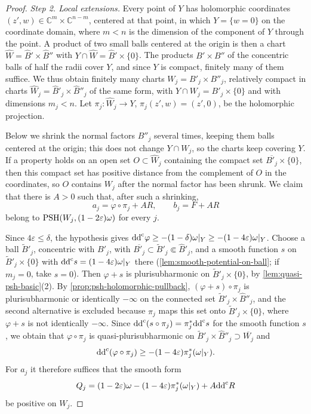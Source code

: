 \begin{proof}
\emph{Step 2. Local extensions.} Every point of $Y$ has holomorphic coordinates $(z',w)\in\mathbb C^m\times\mathbb C^{n-m}$, centered at that point, in which $Y=\{w=0\}$ on the coordinate domain, where $m<n$ is the dimension of the component of $Y$ through the point. A product of two small balls centered at the origin is then a chart $\widehat W=\widehat B'\times\widehat B''$ with $Y\cap\widehat W=\widehat B'\times\{0\}$. The products $B'\times B''$ of the concentric balls of half the radii cover $Y$, and since $Y$ is compact, finitely many of them suffice. We thus obtain finitely many charts $W_j=B'_j\times B''_j$, relatively compact in charts $\widehat W_j=\widehat B'_j\times\widehat B''_j$ of the same form, with $Y\cap W_j=B'_j\times\{0\}$ and with dimensions $m_j<n$. Let $\pi_j\colon\widehat W_j\to Y$, $\pi_j(z',w)=(z',0)$, be the holomorphic projection.

Below we shrink the normal factors $B''_j$ several times, keeping them balls centered at the origin; this does not change $Y\cap W_j$, so the charts keep covering $Y$. If a property holds on an open set $O\subset\widehat W_j$ containing the compact set $\overline{B'_j}\times\{0\}$, then this compact set has positive distance from the complement of $O$ in the coordinates, so $O$ contains $W_j$ after the normal factor has been shrunk. We claim that there is $A>0$ such that, after such a shrinking,
\[
 a_j=\varphi\circ\pi_j+AR,\qquad b_j=F+AR
\]
belong to $\mathrm{PSH}(W_j,(1-2\varepsilon)\omega)$ for every $j$.

Since $4\varepsilon\leq\delta$, the hypothesis gives $\mathrm{dd}^{\mathrm{c}}\varphi\geq-(1-\delta)\omega|_Y\geq-(1-4\varepsilon)\omega|_Y$. Choose a ball $\widetilde B'_j$, concentric with $B'_j$, with $\overline{B'_j}\subset\widetilde B'_j\Subset\widehat B'_j$, and a smooth function $s$ on $\widetilde B'_j\times\{0\}$ with $\mathrm{dd}^{\mathrm{c}} s=(1-4\varepsilon)\omega|_Y$ there (\cref{lem:smooth-potential-on-ball}; if $m_j=0$, take $s=0$). Then $\varphi+s$ is plurisubharmonic on $\widetilde B'_j\times\{0\}$, by \cref{lem:quasi-psh-basic}(2). By \cref{prop:psh-holomorphic-pullback}, $(\varphi+s)\circ\pi_j$ is plurisubharmonic or identically $-\infty$ on the connected set $\widetilde B'_j\times\widehat B''_j$, and the second alternative is excluded because $\pi_j$ maps this set onto $\widetilde B'_j\times\{0\}$, where $\varphi+s$ is not identically $-\infty$. Since $\mathrm{dd}^{\mathrm{c}}(s\circ\pi_j)=\pi_j^*\mathrm{dd}^{\mathrm{c}} s$ for the smooth function $s$, we obtain that $\varphi\circ\pi_j$ is quasi-plurisubharmonic on $\widetilde B'_j\times\widehat B''_j\supset\overline{W_j}$ and
\[
 \mathrm{dd}^{\mathrm{c}}(\varphi\circ\pi_j)\geq-(1-4\varepsilon)\pi_j^*(\omega|_Y).
\]
For $a_j$ it therefore suffices that the smooth form
\[
 Q_j=(1-2\varepsilon)\omega-(1-4\varepsilon)\pi_j^*(\omega|_Y)+A\mathrm{dd}^{\mathrm{c}} R
\]
be positive on $W_j$.


\end{proof}
